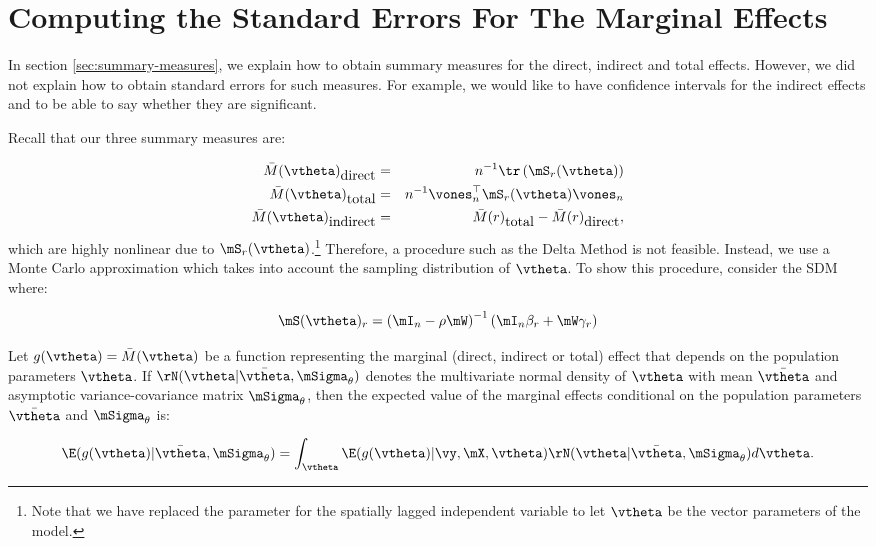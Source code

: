 \documentclass[english,12pt]{book}\usepackage[]{graphicx}\usepackage[]{xcolor}
\begin{document}
\section{Computing the Standard Errors For The Marginal Effects}

In section \ref{sec:summary-measures}, we explain how to obtain summary measures for the direct, indirect and total effects. However, we did not explain how to obtain standard errors for such measures. For example, we would like to have confidence intervals for the indirect effects and to be able to say whether they are significant. 

Recall that our three summary measures are:

\begin{eqnarray*}
\bar{M}(\vtheta)_{\mbox{direct}} & = & n^{-1}\tr\left(\mS_r(\vtheta)\right) \\
\bar{M}(\vtheta)_{\mbox{total}} & = & n^{-1}\vones_n^\top\mS_r(\vtheta)\vones_n \\
\bar{M}(\vtheta)_{\mbox{indirect}} & = & \bar{M}(r)_{\mbox{total}} - \bar{M}(r)_{\mbox{direct}},
\end{eqnarray*}
%
which are highly nonlinear due to $\mS_r(\vtheta)$.\footnote{Note that we have replaced the parameter for the spatially lagged independent variable to let $\vtheta$ be the vector parameters of the model. } Therefore, a procedure such as the Delta Method is not feasible. Instead, we use a Monte Carlo approximation which takes into account the sampling distribution of $\vtheta$. To show this procedure, consider the SDM where:

\begin{equation*}
\mS(\vtheta)_r = \left(\mI_n - \rho\mW\right)^{-1}\left(\mI_n\beta_r + \mW\gamma_r\right)
\end{equation*}


Let $g(\vtheta)= \bar{M}(\vtheta)$ be a function representing the marginal (direct, indirect or total) effect that depends on the population parameters $\vtheta$. If $\rN(\vtheta|\bar{\vtheta}, \mSigma_{\theta})$ denotes the multivariate normal density of $\vtheta$ with mean $\bar{\vtheta}$ and asymptotic variance-covariance matrix $\mSigma_{\theta}$, then the expected value of the marginal effects conditional on the population parameters $\bar{\vtheta}$ and $\mSigma_{\theta}$ is:

\begin{equation}
\E(g(\vtheta)|\bar{\vtheta}, \mSigma_{\theta}) = \int_{\vtheta}\E(g(\vtheta)|\vy, \mX, \vtheta)\rN(\vtheta|\bar{\vtheta}, \mSigma_{\theta})d\vtheta. 
\end{equation}
\end{document}
